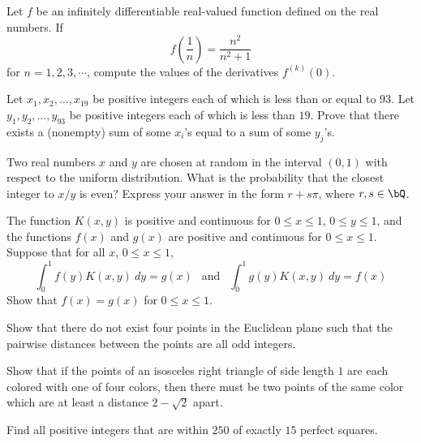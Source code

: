 \documentclass[12pt]{article}
\begin{document}
    \begin{exercise}[1992 A4]
        Let $f$ be an infinitely differentiable real-valued function defined on the real numbers. If \[f\left(\frac{1}{n}\right) =\frac{n^2}{n^2+1}\] for $n=1,2,3,\cdots$, compute the values of the derivatives $f^{(k)}(0)$.
    \end{exercise}

    \begin{exercise}[1993 A4]
        Let $x_1,x_2,\dots,x_{19}$ be positive integers each of which is less than or equal to $93$. Let $y_1,y_2,\dots,y_{93}$ be positive integers each of which is less than $19$. Prove that there exists a (nonempty) sum of some $x_{i}$'s equal to a sum of some $y_j$'s.
    \end{exercise}

    \begin{exercise}[1993 B3]
        Two real numbers \(x\) and \(y\) are chosen at random in the interval \((0,1)\) with respect to the uniform distribution.
        What is the probability that the closest integer to \(x/y\) is even? 
        Express your answer in the form \(r+s\pi\), where \(r,s\in\bQ\).
    \end{exercise}

    \begin{exercise}[1993 B4]
        The function $K(x,y)$ is positive and continuous for $0\leqslant x \leqslant 1$, $0\leqslant y \leqslant 1$, and the functions $f(x)$ and $g(x)$ are positive and continuous for $0\leqslant x \leqslant 1$. Suppose that for all $x$, $0\leqslant x \leqslant 1$,
        \[\int_0^1f(y)K(x,y)\ dy = g(x)\ \ \text{ and }\ \ \int_0^1 g(y)K(x,y)\ dy = f(x)\] Show that $f(x)=g(x)$ for $0\leqslant x \leqslant 1$. 
    \end{exercise}
        
    \begin{exercise}[1993 B5]
        Show that there do not exist four points in the Euclidean plane such that the pairwise distances between the points are all odd integers. 
    \end{exercise}

    \begin{exercise}[1994 A3]
        Show that if the points of an isosceles right triangle of side length $1$ are each colored with one of four colors, then there must be two points of the same color which are at least a distance $2-\sqrt{2}$ apart. 
    \end{exercise}

    \begin{exercise}[1994 B1]
        Find all positive integers that are within $250$ of exactly $15$ perfect squares.
    \end{exercise}
        
\end{document}
